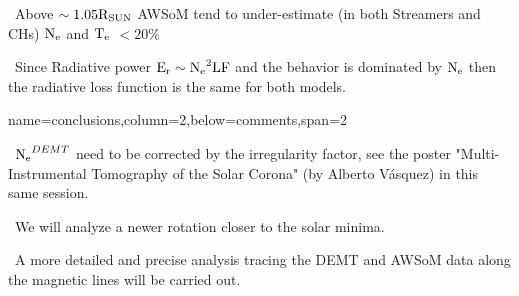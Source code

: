 \documentclass[paperwidth=100cm,paperheight=120cm]{baposter}
\def\bu{\textcolor{red}{\textbullet~}}
\def\bu{\textcolor{red}{\textbullet~}}
\begin{document}
\begin{poster}
{{\bu Above $\sim 1.05 {\rm R_{SUN}}$ AWSoM tend to under-estimate (in both Streamers and CHs) ${\rm N_e}$ and ${\rm T_e}$ $< 20 \%$


\bu Since Radiative power ${\rm E_r}\sim {\rm N_e}^2 {\rm LF}$ and the behavior is dominated by ${\rm N_e}$ then the radiative loss function is the same for both models.
}
}

{name=conclusions,column=2,below=comments,span=2}{
{\footnotesize\sf
\bu ${\rm N_e}^ {DEMT}$ need to be corrected by the irregularity factor, see the poster "Multi-Instrumental Tomography of the Solar Corona" (by Alberto Vásquez) in this same session.

\bu We will analyze a newer rotation closer to the solar minima.

\bu A more detailed and precise analysis tracing the DEMT and AWSoM data along the magnetic lines will be carried out.

}
}

\end{poster}%
\end{document}
